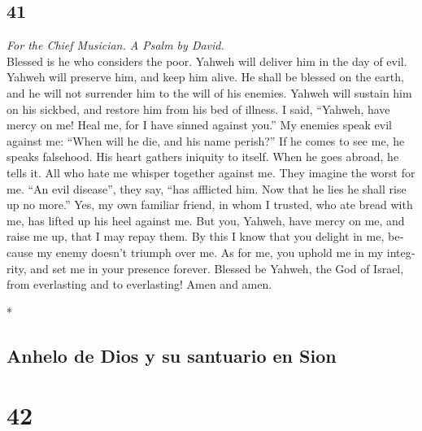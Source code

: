\begin{paracol}{2}
\begin{otherlanguage}{english}
\hypertarget{section-81}{%
\section{41}\label{section-81}}

\emph{For the Chief Musician. A Psalm by David.}\\
 Blessed is he who considers the poor. Yahweh will deliver
him in the day of evil.  Yahweh will preserve him, and
keep him alive. He shall be blessed on the earth, and he will not
surrender him to the will of his enemies.  Yahweh will
sustain him on his sickbed, and restore him from his bed of illness.
 I said, ``Yahweh, have mercy on me! Heal me, for I have
sinned against you.''  My enemies speak evil against me:
``When will he die, and his name perish?''  If he comes to
see me, he speaks falsehood. His heart gathers iniquity to itself. When
he goes abroad, he tells it.  All who hate me whisper
together against me. They imagine the worst for me.  ``An
evil disease'', they say, ``has afflicted him. Now that he lies he shall
rise up no more.''  Yes, my own familiar friend, in whom I
trusted, who ate bread with me, has lifted up his heel against me.
 But you, Yahweh, have mercy on me, and raise me up, that
I may repay them.  By this I know that you delight in me,
because my enemy doesn't triumph over me.  As for me, you
uphold me in my integrity, and set me in your presence forever.
 Blessed be Yahweh, the God of Israel, from everlasting
and to everlasting! Amen and amen.

\end{otherlanguage}

\switchcolumn[0]*

\hypertarget{anhelo-de-dios-y-su-santuario-en-sion}{%
\subsection{Anhelo de Dios y su santuario en
Sion}\label{anhelo-de-dios-y-su-santuario-en-sion}}

\hypertarget{section-82}{%
\section{42}\label{section-82}}


\end{paracol}
